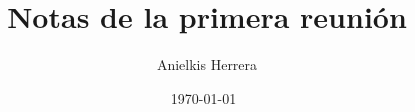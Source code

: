 \documentclass[12pt, spanish, oneside, onecolumn, a4paper]{article}
\begin{document}

\title{ Notas de la primera reunión } \date{ \today\ } \author{
  Anielkis Herrera }

\maketitle

\begin{abstract}

\end{abstract}

\newpage {}
\end{document}
